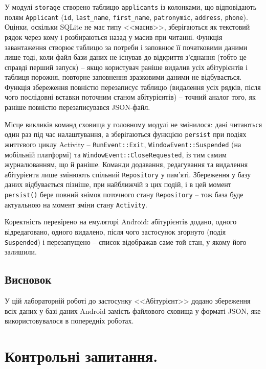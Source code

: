 \documentclass[14pt, a4paper]{extreport}
\begin{document}
	У модулі \texttt{storage} створено таблицю \texttt{applicants} із колонками, що відповідають полям \texttt{Applicant} (\texttt{id}, \texttt{last\_name}, \texttt{first\_name}, \texttt{patronymic}, \texttt{address}, \texttt{phone}). Оцінки, оскільки SQLite не має типу <<масив>>, зберігаються як текстовий рядок через кому і розбираються назад у масив при читанні. Функція завантаження створює таблицю за потреби і заповнює її початковими даними лише тоді, коли файл бази даних не існував до відкриття з'єднання (тобто це справді перший запуск) -- якщо користувач раніше видалив усіх абітурієнтів і таблиця порожня, повторне заповнення зразковими даними не відбувається. Функція збереження повністю перезаписує таблицю (видалення усіх рядків, після чого послідовні вставки поточним станом абітурієнтів) -- точний аналог того, як раніше повністю перезаписувався JSON-файл.
	
	Місце викликів команд сховища у головному модулі не змінилося: дані читаються один раз під час налаштування, а зберігаються функцією \texttt{persist} при подіях життєвого циклу Activity -- \texttt{RunEvent::Exit}, \texttt{WindowEvent::Suspended} (на мобільній платформі) та \texttt{WindowEvent::CloseRequested}, із тим самим журналюванням, що й раніше. Команди додавання, редагування та видалення абітурієнта лише змінюють спільний \texttt{Repository} у пам'яті. Збереження у базу даних відбувається пізніше, при найближчій з цих подій, і в цей момент \texttt{persist()} бере повний знімок поточного стану \texttt{Repository} -- тож база буде актуальною на момент зміни стану \texttt{Activity}.
	
	Коректність перевірено на емуляторі Android: абітурієнтів додано, одного відредаговано, одного видалено, після чого застосунок згорнуто (подія \texttt{Suspended}) і перезапущено -- список відображав саме той стан, у якому його залишили.

	\subsection*{Висновок}

	У цій лабораторній роботі до застосунку <<Абітурієнт>> додано збереження всіх даних у базі даних Android замість файлового сховища у форматі JSON, яке використовувалося в попередніх роботах.
	
	\section*{Контрольні запитання.}
\end{document}
